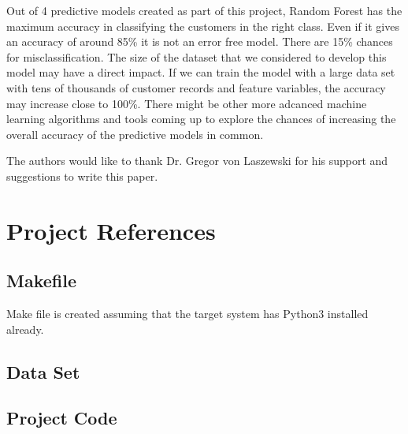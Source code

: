 \documentclass[sigconf]{acmart}
\begin{document}
Out of 4 predictive models created as part of this project, Random Forest has the maximum accuracy in classifying the customers in the right class. Even if it gives an accuracy of around 85\% it is not an error free model. There are 15\% chances for misclassification. The size of the dataset that we considered to develop this model may have a direct impact. If we can train the model with a large data set with tens of thousands of customer records and feature variables, the accuracy may increase close to 100\%. There might be other more adcanced machine learning algorithms and tools coming up to explore the chances of increasing the overall accuracy of the predictive models in common.


\begin{acks}

  The authors would like to thank Dr. Gregor von Laszewski for his
  support and suggestions to write this paper.

\end{acks}


 

\appendix

\section{Project References}
\subsection{Makefile}\label{Makefile}

Make file is created assuming that the target system has Python3 installed already.

\subsection{Data Set}
\subsection{Project Code}\label{Project Code}
\end{document}
